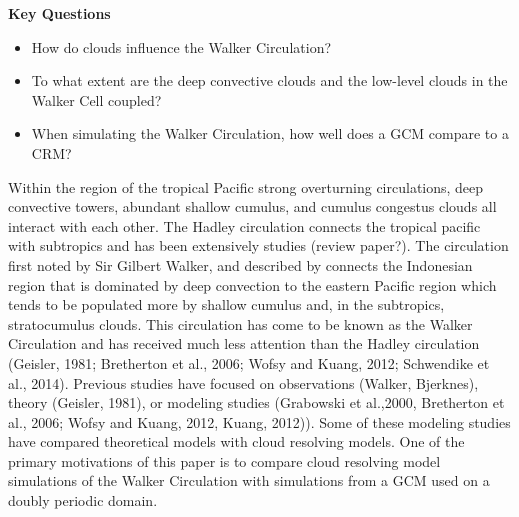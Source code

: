 \documentclass[draft]{agujournal2019}
\begin{document}

\textbf{Key Questions}
\begin{itemize}
  \item{How do clouds influence the Walker Circulation?}
  \item{To what extent are the deep convective clouds and the low-level clouds in the Walker Cell coupled?}
  \item{When simulating the Walker Circulation, how well does a GCM compare to a CRM?}  
\end{itemize}

Within the region of the tropical Pacific strong overturning circulations, deep convective towers, abundant shallow 
cumulus, and cumulus congestus clouds all interact with each other.  The Hadley circulation connects the tropical 
pacific with subtropics and has been extensively studies (review paper?).  The circulation first 
  noted by Sir Gilbert Walker, and described by  connects the Indonesian region that is dominated by deep 
  convection to the eastern Pacific region which tends to be populated more by shallow cumulus and, in the 
  subtropics, stratocumulus clouds.  This circulation has come to be 
  known as the Walker Circulation and has received much less attention than the Hadley circulation (Geisler, 1981; Bretherton et al., 
  2006; Wofsy and Kuang, 2012; Schwendike et al., 2014).  Previous studies have focused on observations (Walker, Bjerknes), theory 
  (Geisler, 1981), or modeling studies (Grabowski et al.,2000, Bretherton et al., 2006; Wofsy and Kuang, 2012, 
  Kuang, 2012)).  Some of these modeling studies have compared theoretical models with cloud
  resolving models.  One of the primary motivations of this paper is to compare cloud resolving model simulations of the Walker 
  Circulation with simulations from a GCM used on a doubly periodic domain.
  
\end{document}
